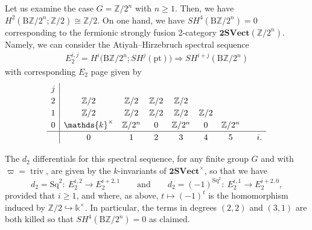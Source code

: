 \documentclass[10pt,a4paper]{amsart}
\numberwithin{equation}{section}
\begin{document}
\begin{Example}\label{ex:FSF2CZ/2}
Let us examine the case $G=\mathbb{Z}/2^n$ with $n\geq 1$. Then, we have $H^2(\mathrm{B}\mathbb{Z}/2^n;\mathbb{Z}/2)\allowbreak\cong\mathbb{Z}/2$. On one hand, we have $SH^{4}(\mathrm{B}\mathbb{Z}/2^n)=0$ corresponding to the fermionic strongly fusion 2-category $\mathbf{2SVect}(\mathbb{Z}/2^n)$. Namely, we can consider the Atiyah--Hirzebruch spectral sequence
\begin{gather*}
E_2^{i,j}=H^i\big(\mathrm{B}\mathbb{Z}/2^n;SH^j(\mathrm{pt})\big)\Rightarrow SH^{i+j}(\mathrm{B}\mathbb{Z}/2^n)
\end{gather*}
 with corresponding $E_2$ page given by
\begin{gather*}\renewcommand{\arraystretch}{1.2}\begin{array}{c|ccccccc}
 j \\
 2 & \mathbb{Z}/2 & \mathbb{Z}/2 & \mathbb{Z}/2 & \mathbb{Z}/2 \\
 1 & \mathbb{Z}/2 & \mathbb{Z}/2 & \mathbb{Z}/2 & \mathbb{Z}/2 & \mathbb{Z}/2\\
 0 & \mathds{k}^{\times}& \mathbb{Z}/2^n & 0 & \mathbb{Z}/2^n & 0 & \mathbb{Z}/2^n \\
 \hline
 & 0 & 1 & 2 & 3 & 4 & 5 & \quad i.
\end{array}\end{gather*}

The $d_2$ differentials for this spectral sequence, for any finite group $G$ and with $\varpi=\operatorname{triv}$, are given by the $k$-invariants of $\mathbf{2SVect}^{\times}$, so that we have
\begin{equation}\label{eq:untwistedd2s}
d_2=\mathrm{Sq}^2\colon\ E^{i,2}_2\rightarrow E^{i+2,1}_2\qquad \textrm{and}\qquad d_2=(-1)^{\mathrm{Sq}^2}\colon\ E^{i,1}_2\rightarrow E^{i+2,0}_2,
\end{equation}
provided that $i\geq 1$, and where, as above, $t\mapsto (-1)^{t}$ is the homomorphism induced by $\mathbb{Z}/2\hookrightarrow \mathds{k}^{\times}$. In particular, the terms in degrees $(2,2)$ and $(3,1)$ are both killed so that $SH^{4}(\mathrm{B}\mathbb{Z}/2^n)=0$ as claimed.


\end{Example}
\end{document}
